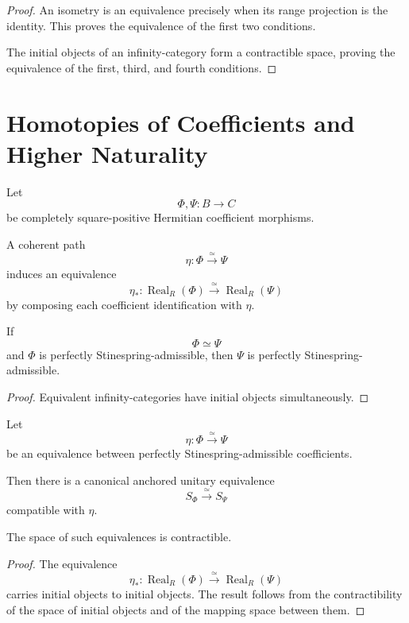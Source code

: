 \begin{proof}
An isometry is an equivalence precisely when its range projection is the
identity. This proves the equivalence of the first two conditions.

The initial objects of an infinity-category form a contractible space, proving
the equivalence of the first, third, and fourth conditions.
\end{proof}

\section{Homotopies of Coefficients and Higher Naturality}
\label{sec:higher-stinespring-homotopy-naturality}

Let
\[
  \Phi,\Psi:B\to C
\]
be completely square-positive Hermitian coefficient morphisms.

A coherent path
\[
  \eta:\Phi\xrightarrow{\simeq}\Psi
\]
induces an equivalence
\[
  \eta_*:
  \operatorname{Real}_R(\Phi)
  \xrightarrow{\simeq}
  \operatorname{Real}_R(\Psi)
\]
by composing each coefficient identification with \(\eta\).

\begin{proposition}
\label{prop:higher-admissibility-homotopy-invariant}
If
\[
  \Phi\simeq\Psi
\]
and \(\Phi\) is perfectly Stinespring-admissible, then \(\Psi\) is perfectly
Stinespring-admissible.
\end{proposition}

\begin{proof}
Equivalent infinity-categories have initial objects simultaneously.
\end{proof}

\begin{theorem}
\label{thm:higher-stinespring-homotopy-naturality}
Let
\[
  \eta:\Phi\xrightarrow{\simeq}\Psi
\]
be an equivalence between perfectly Stinespring-admissible coefficients.

Then there is a canonical anchored unitary equivalence
\[
  S_\Phi
  \xrightarrow{\simeq}
  S_\Psi
\]
compatible with \(\eta\).

The space of such equivalences is contractible.
\end{theorem}

\begin{proof}
The equivalence
\[
  \eta_*:
  \operatorname{Real}_R(\Phi)
  \xrightarrow{\simeq}
  \operatorname{Real}_R(\Psi)
\]
carries initial objects to initial objects. The result follows from the
contractibility of the space of initial objects and of the mapping space
between them.
\end{proof}

